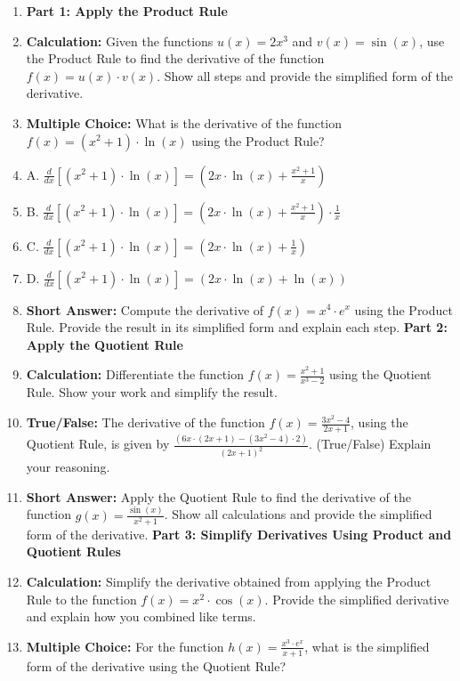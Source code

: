 {\begin{enumerate}
    \item \textbf{Part 1: Apply the Product Rule}
    \item \textbf{Calculation:} Given the functions $u(x) = 2x^3$ and $v(x) = \sin(x)$, use the Product Rule to find the derivative of the function $f(x) = u(x) \cdot v(x)$. Show all steps and provide the simplified form of the derivative.
    \item \textbf{Multiple Choice:} What is the derivative of the function $f(x) = (x^2 + 1) \cdot \ln(x)$ using the Product Rule?
    \item A. $\frac{d}{dx} \left[(x^2 + 1) \cdot \ln(x)\right] = (2x \cdot \ln(x) + \frac{x^2 + 1}{x})$
    \item B. $\frac{d}{dx} \left[(x^2 + 1) \cdot \ln(x)\right] = (2x \cdot \ln(x) + \frac{x^2 + 1}{x}) \cdot \frac{1}{x}$
    \item C. $\frac{d}{dx} \left[(x^2 + 1) \cdot \ln(x)\right] = (2x \cdot \ln(x) + \frac{1}{x})$
    \item D. $\frac{d}{dx} \left[(x^2 + 1) \cdot \ln(x)\right] = (2x \cdot \ln(x) + \ln(x))$
    \item \textbf{Short Answer:} Compute the derivative of $f(x) = x^4 \cdot e^x$ using the Product Rule. Provide the result in its simplified form and explain each step. \textbf{Part 2: Apply the Quotient Rule}
    \item \textbf{Calculation:} Differentiate the function $f(x) = \frac{x^2 + 1}{x^3 - 2}$ using the Quotient Rule. Show your work and simplify the result.
    \item \textbf{True/False:} The derivative of the function $f(x) = \frac{3x^2 - 4}{2x + 1}$, using the Quotient Rule, is given by $\frac{(6x \cdot (2x + 1) - (3x^2 - 4) \cdot 2)}{(2x + 1)^2}$. (True/False) Explain your reasoning.
    \item \textbf{Short Answer:} Apply the Quotient Rule to find the derivative of the function $g(x) = \frac{\sin(x)}{x^2 + 1}$. Show all calculations and provide the simplified form of the derivative. \textbf{Part 3: Simplify Derivatives Using Product and Quotient Rules}
    \item \textbf{Calculation:} Simplify the derivative obtained from applying the Product Rule to the function $f(x) = x^2 \cdot \cos(x)$. Provide the simplified derivative and explain how you combined like terms.
    \item \textbf{Multiple Choice:} For the function $h(x) = \frac{x^3 \cdot e^x}{x + 1}$, what is the simplified form of the derivative using the Quotient Rule?

\end{enumerate}}
